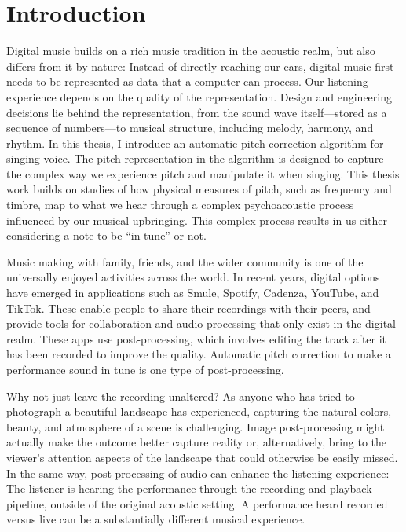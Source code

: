 \chapter{Introduction}
\label{chap:thesis-intro}

Digital music builds on a rich music tradition in the acoustic realm, but also differs from it by nature: Instead of directly reaching our ears, digital music first needs to be represented as data that a computer can process. Our listening experience depends on the quality of the representation. Design and engineering decisions lie behind the representation, from the sound wave itself---stored as a sequence of numbers---to musical structure, including melody, harmony, and rhythm. In this thesis, I introduce an automatic pitch correction algorithm for singing voice. The pitch representation in the algorithm is designed to capture the complex way we experience pitch and manipulate it when singing. This thesis work builds on studies of how physical measures of pitch, such as frequency and timbre, map to what we hear through a complex psychoacoustic process influenced by our musical upbringing. This complex process results in us either considering a note to be ``in tune'' or not.

Music making with family, friends, and the wider community is one of the universally enjoyed activities across the world. In recent years, digital options have emerged in applications such as Smule, Spotify, Cadenza, YouTube, and TikTok. These enable people to share their recordings with their peers, and provide tools for collaboration and audio processing that only exist in the digital realm. These apps use post-processing, which involves editing the track after it has been recorded to improve the quality. Automatic pitch correction to make a performance sound in tune is one type of post-processing. 

Why not just leave the recording unaltered? As anyone who has tried to photograph a beautiful landscape has experienced, capturing the natural colors, beauty, and atmosphere of a scene is challenging. Image post-processing might actually make the outcome better capture reality or, alternatively, bring to the viewer's attention aspects of the landscape that could otherwise be easily missed. In the same way, post-processing of audio can enhance the listening experience: The listener is hearing the performance through the recording and playback pipeline, outside of the original acoustic setting. A performance heard recorded versus live can be a substantially different musical experience.

